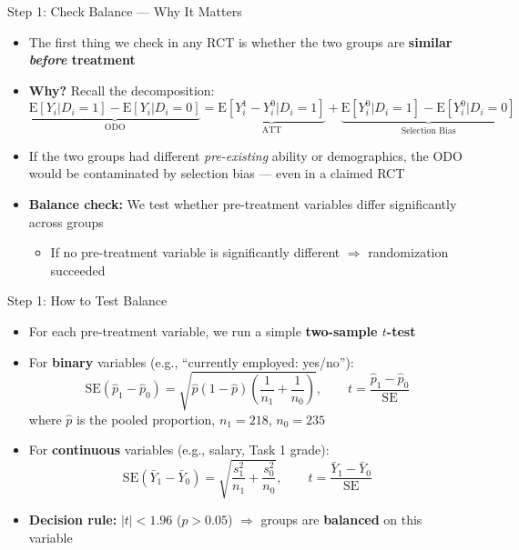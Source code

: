 \documentclass[hyperref={pdfpagelabels=false}]{beamer}
\begin{document}
	\begin{frame}{Step 1: Check Balance --- Why It Matters}
		\begin{itemize}
			\item The first thing we check in any RCT is whether the two groups are \textbf{similar \emph{before} treatment}
			\vspace{0.3cm}
			\item \textbf{Why?} Recall the decomposition:
			\begin{equation*}
				\underbrace{\mathrm{E}[Y_i|D_i=1]-\mathrm{E}[Y_i|D_i=0]}_{\text{ODO}} = \underbrace{\mathrm{E}[Y^1_i - Y^0_i | D_i=1]}_{\text{ATT}} + \underbrace{\mathrm{E}[Y^0_i|D_i=1]-\mathrm{E}[Y^0_i|D_i=0]}_{\text{Selection Bias}}
			\end{equation*}
			\vspace{0.2cm}
			\item If the two groups had different \emph{pre-existing} ability or demographics, the ODO would be contaminated by selection bias --- even in a claimed RCT
			\vspace{0.3cm}
			\item \textbf{Balance check:} We test whether pre-treatment variables differ significantly across groups
			\vspace{0.2cm}
			\begin{itemize}
				\item If no pre-treatment variable is significantly different $\Rightarrow$ randomization succeeded
			\end{itemize}
		\end{itemize}
	\end{frame}
	
	\begin{frame}{Step 1: How to Test Balance}
		\begin{itemize}
			\item For each pre-treatment variable, we run a simple \textbf{two-sample $t$-test}
			\vspace{0.3cm}
			\item For \textbf{binary} variables (e.g., ``currently employed: yes/no''):
			\begin{equation*}
				\mathrm{SE}(\hat{p}_1 - \hat{p}_0) = \sqrt{\hat{p}(1-\hat{p})\left(\frac{1}{n_1}+\frac{1}{n_0}\right)}, \qquad
				t = \frac{\hat{p}_1 - \hat{p}_0}{\mathrm{SE}}
			\end{equation*}
			\vspace{0.1cm}
			where $\hat{p}$ is the pooled proportion, $n_1 = 218$, $n_0 = 235$
			\vspace{0.3cm}
			\item For \textbf{continuous} variables (e.g., salary, Task 1 grade):
			\begin{equation*}
				\mathrm{SE}(\bar{Y}_1 - \bar{Y}_0) = \sqrt{\frac{s_1^2}{n_1}+\frac{s_0^2}{n_0}}, \qquad
				t = \frac{\bar{Y}_1 - \bar{Y}_0}{\mathrm{SE}}
			\end{equation*}
			\vspace{0.2cm}
			\item \textbf{Decision rule:} $|t| < 1.96$ ($p > 0.05$) $\Rightarrow$ groups are \textbf{balanced} on this variable
		\end{itemize}
	\end{frame}
	
\end{document}
